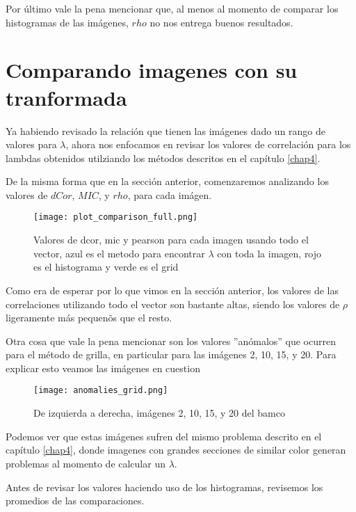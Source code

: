         Por \'ultimo vale la pena mencionar que, al menos al momento de comparar los histogramas de las im\'agenes, $rho$ no nos entrega buenos resultados. 


\section{Comparando imagenes con su tranformada}

    Ya habiendo revisado la relaci\'on que tienen las im\'agenes dado un rango de valores para $\lambda$, ahora nos enfocamos en revisar los valores de correlaci\'on para los lambdas obtenidos utilziando los m\'etodos descritos en el cap\'itulo \ref{chap4}. 
    
    De la misma forma que en la secci\'on anterior, comenzaremos analizando los valores de $dCor$, $MIC$, y $rho$, para cada im\'agen.
    
    \begin{figure}[H]
        \centering
        \texttt{[image: plot\_comparison\_full.png]}
        \caption{Valores de dcor, mic y pearson para cada imagen usando todo el vector, azul es el metodo para encontrar $\lambda$ con toda la imagen, rojo es el histograma y verde es el grid}
    \end{figure}

    Como era de esperar por lo que vimos en la secci\'on anterior, los valores de las correlaciones utilizando todo el vector son bastante altas, siendo los valores de $\rho$ ligeramente m\'as pequen\~os que el resto. 

    Otra cosa que vale la pena mencionar son los valores ''an\'omalos'' que ocurren para el m\'etodo de grilla, en particular para las im\'agenes 2, 10, 15, y 20. Para explicar esto veamos las im\'agenes en cuestion

    \begin{figure}[H]
        \centering
        \texttt{[image: anomalies\_grid.png]}
        \caption{De izquierda a derecha, im\'agenes 2, 10, 15, y 20 del bamco \cite{KodakLosslessTrueColorImageSuite}}
    \end{figure}

    Podemos ver que estas im\'agenes sufren del mismo problema descrito en el cap\'itulo \ref{chap4}, donde imagenes con grandes secciones de similar color generan problemas al momento de calcular un $\lambda$.

    Antes de revisar los valores haciendo uso de los histogramas, revisemos los promedios de las comparaciones. 

